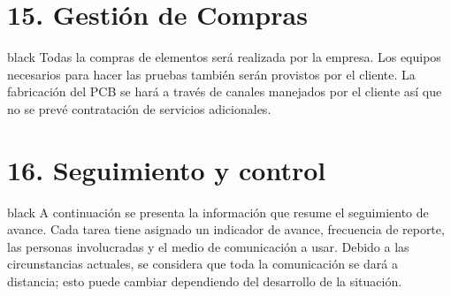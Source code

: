 \documentclass[11pt]{charter}
\begin{document}
\section{15. Gestión de Compras}
\label{sec:compras}

\begin{consigna}{black}
Todas la compras de elementos será realizada por la empresa. Los equipos necesarios para hacer las pruebas también serán provistos por el cliente. La fabricación del PCB se hará a través de canales manejados por el cliente así que no se prevé contratación de servicios adicionales.
\end{consigna}

\section{16. Seguimiento y control}
\label{sec:seguimiento}
\begin{consigna}{black}
A continuación se presenta la información que resume el seguimiento de avance. Cada tarea tiene asignado un indicador de avance, frecuencia de reporte, las personas involucradas y el medio de comunicación a usar. Debido a las circunstancias actuales, se considera que toda la comunicación se dará a distancia; esto puede cambiar dependiendo del desarrollo de la situación.
\end{consigna}
\end{document}
